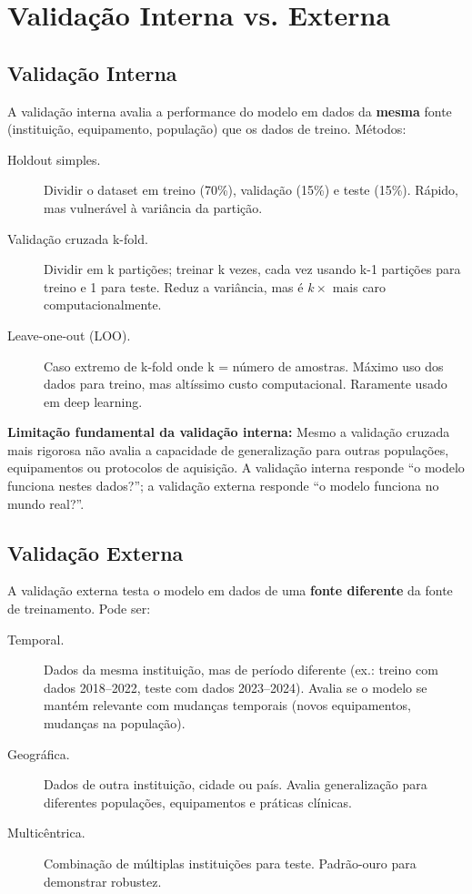 \section{Validação Interna vs. Externa}

\subsection{Validação Interna}

A validação interna  avalia a performance do modelo em dados da \textbf{mesma} fonte (instituição, equipamento, população) que os dados de treino. Métodos:

\begin{description}
    \item[Holdout simples.] Dividir o dataset em treino (70\%), validação (15\%) e teste (15\%). Rápido, mas vulnerável à variância da partição.
    \item[Validação cruzada k-fold.] Dividir em k partições; treinar k vezes, cada vez usando k-1 partições para treino e 1 para teste. Reduz a variância, mas é $k \times$ mais caro computacionalmente.
    \item[Leave-one-out (LOO).] Caso extremo de k-fold onde k = número de amostras. Máximo uso dos dados para treino, mas altíssimo custo computacional. Raramente usado em deep learning.
\end{description}

\textbf{Limitação fundamental da validação interna:} Mesmo a validação cruzada mais rigorosa não avalia a capacidade de generalização para outras populações, equipamentos ou protocolos de aquisição. A validação interna responde ``o modelo funciona nestes dados?''; a validação externa responde ``o modelo funciona no mundo real?''.

\subsection{Validação Externa}

A validação externa  testa o modelo em dados de uma \textbf{fonte diferente} da fonte de treinamento. Pode ser:

\begin{description}
    \item[Temporal.] Dados da mesma instituição, mas de período diferente (ex.: treino com dados 2018--2022, teste com dados 2023--2024). Avalia se o modelo se mantém relevante com mudanças temporais (novos equipamentos, mudanças na população).
    \item[Geográfica.] Dados de outra instituição, cidade ou país. Avalia generalização para diferentes populações, equipamentos e práticas clínicas.
    \item[Multicêntrica.] Combinação de múltiplas instituições para teste. Padrão-ouro para demonstrar robustez.
\end{description}

